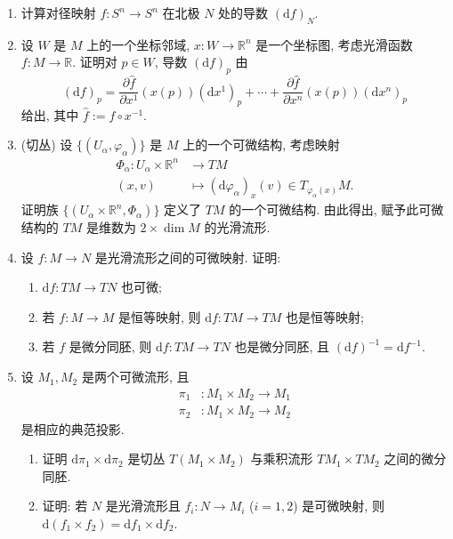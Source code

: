 \begin{RiemannExercise}
\begin{enumerate}[label=(\arabic*),ref=\arabic*,leftmargin=*]
\[\]
给出. 确定在 $U$ 的每一点, $\frac{\partial}{\partial r}$, $\frac{\partial}{\partial\theta}$ 和 $\frac{\partial}{\partial\varphi}$ 的 Cartesian 分量.
\item\label{ex:derivative-of-antipodal-map-at-north-pole} 计算对径映射 $f:S^n\to S^n$ 在北极 $N$ 处的导数 $(\mathrm{d}f)_N$.
\item\label{ex:coordinate-differential-of-scalar-function} 设 $W$ 是 $M$ 上的一个坐标邻域, $x:W\to\mathbb{R}^n$ 是一个坐标图, 考虑光滑函数 $f:M\to\mathbb{R}$. 证明对 $p\in W$, 导数 $(\mathrm{d}f)_p$ 由
\[
  (\mathrm{d}f)_p
  =\frac{\partial\widehat f}{\partial x^1}(x(p))(\mathrm{d}x^1)_p+\cdots
  +\frac{\partial\widehat f}{\partial x^n}(x(p))(\mathrm{d}x^n)_p
\]
给出, 其中 $\widehat f:=f\circ x^{-1}$.
\item\label{ex:tangent-bundle-chart-construction} (切丛) 设 $\{(U_\alpha,\varphi_\alpha)\}$ 是 $M$ 上的一个可微结构, 考虑映射
\begin{align*}
  \Phi_\alpha:U_\alpha\times\mathbb{R}^n&\to TM\\
  (x,v)&\mapsto(\mathrm{d}\varphi_\alpha)_x(v)\in T_{\varphi_\alpha(x)}M.
\end{align*}
证明族 $\{(U_\alpha\times\mathbb{R}^n,\Phi_\alpha)\}$ 定义了 $TM$ 的一个可微结构. 由此得出, 赋予此可微结构的 $TM$ 是维数为 $2\times\dim M$ 的光滑流形.
\item\label{ex:smoothness-and-inverse-of-pushforward} 设 $f:M\to N$ 是光滑流形之间的可微映射. 证明:
\begin{enumerate}[label=(\alph*),leftmargin=*]
\item $\mathrm{d}f:TM\to TN$ 也可微;
\item 若 $f:M\to M$ 是恒等映射, 则 $\mathrm{d}f:TM\to TM$ 也是恒等映射;
\item 若 $f$ 是微分同胚, 则 $\mathrm{d}f:TM\to TN$ 也是微分同胚, 且 $(\mathrm{d}f)^{-1}=\mathrm{d}f^{-1}$.
\end{enumerate}
\item\label{ex:tangent-bundle-of-product-manifolds} 设 $M_1,M_2$ 是两个可微流形, 且
\begin{align*}
  \pi_1 &: M_1\times M_2\to M_1\\
  \pi_2 &: M_1\times M_2\to M_2
\end{align*}
是相应的典范投影.
\begin{enumerate}[label=(\alph*),leftmargin=*]
\item 证明 $\mathrm{d}\pi_1\times\mathrm{d}\pi_2$ 是切丛 $T(M_1\times M_2)$ 与乘积流形 $TM_1\times TM_2$ 之间的微分同胚.
\item 证明: 若 $N$ 是光滑流形且 $f_i:N\to M_i$ ($i=1,2$) 是可微映射, 则 $\mathrm{d}(f_1\times f_2)=\mathrm{d}f_1\times\mathrm{d}f_2$.
\end{enumerate}
\end{enumerate}
\end{RiemannExercise}
